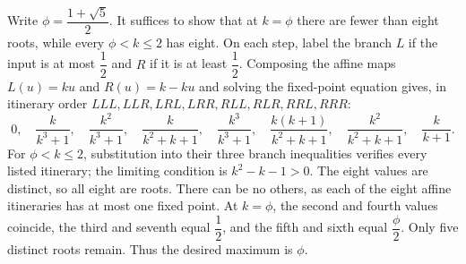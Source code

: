 Write $\phi=\dfrac{1+\sqrt5}{2}$. It suffices to show that at $ k=\phi $ there are fewer than eight roots, while every $\phi<k\le2 $ has eight. On each step, label the branch $ L $ if the input is at most $\dfrac{1}{2}$ and $ R $ if it is at least $\dfrac{1}{2}$. Composing the affine maps $ L(u)=ku $ and $ R(u)=k-ku $ and solving the fixed-point equation gives, in itinerary order $ LLL,LLR,LRL,LRR,RLL,RLR,RRL,RRR $:
\[0,\quad\dfrac{k}{k^3+1},\quad\dfrac{k^2}{k^3+1},\quad\dfrac{k}{k^2+k+1},\quad\dfrac{k^3}{k^3+1},\quad\dfrac{k(k+1)}{k^2+k+1},\quad\dfrac{k^2}{k^2+k+1},\quad\dfrac{k}{k+1}.\]
For $\phi<k\le2 $, substitution into their three branch inequalities verifies every listed itinerary; the limiting condition is $ k^2-k-1>0 $. The eight values are distinct, so all eight are roots. There can be no others, as each of the eight affine itineraries has at most one fixed point. At $ k=\phi $, the second and fourth values coincide, the third and seventh equal $\dfrac{1}{2}$, and the fifth and sixth equal $\dfrac{\phi}{2}$. Only five distinct roots remain. Thus the desired maximum is $\boxed{\phi}$.
